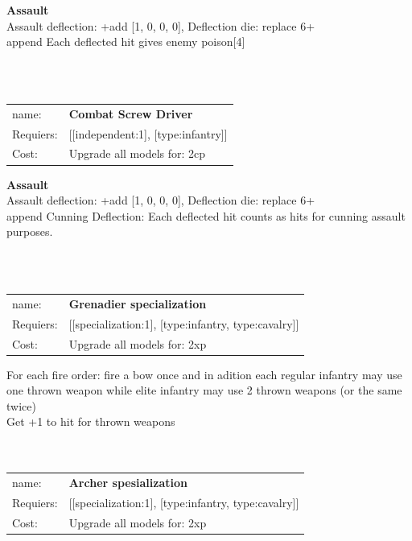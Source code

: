 {\bf Assault} \ \\
Assault deflection: +add [1, 0, 0, 0], Deflection die: replace 6+
\\ 

append Each deflected hit gives enemy poison[4]


\ \\
\ \\
\begin{tabular}{ll}
name: & {\bf Combat Screw Driver } \\
Requiers: & [[independent:1], [type:infantry]] \\
Cost: & Upgrade all models for: 2cp \\
\end{tabular}





{\bf Assault} \ \\
Assault deflection: +add [1, 0, 0, 0], Deflection die: replace 6+
\\ 

append Cunning Deflection: Each deflected hit counts as hits for cunning assault purposes.


\ \\
\ \\
\begin{tabular}{ll}
name: & {\bf Grenadier specialization } \\
Requiers: & [[specialization:1], [type:infantry, type:cavalry]] \\
Cost: & Upgrade all models for: 2xp \\
\end{tabular}

For each fire order: fire a bow once and in adition each regular infantry may use one thrown weapon while elite infantry may use 2 thrown weapons (or the same twice)\\ 
Get +1 to hit for thrown weapons\\ 









\ \\
\ \\
\begin{tabular}{ll}
name: & {\bf Archer spesialization } \\
Requiers: & [[specialization:1], [type:infantry, type:cavalry]] \\
Cost: & Upgrade all models for: 2xp \\
\end{tabular}


